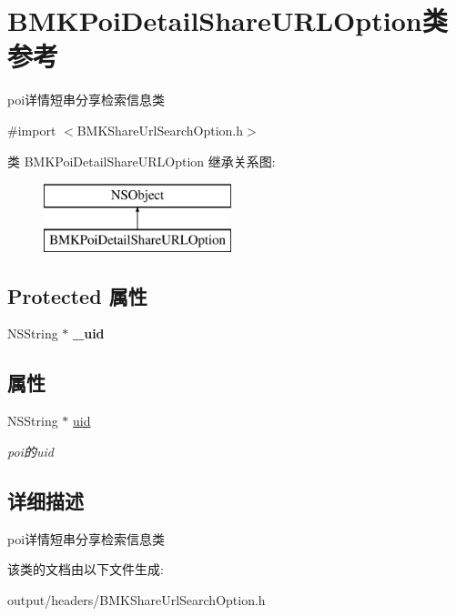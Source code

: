 \hypertarget{interface_b_m_k_poi_detail_share_u_r_l_option}{}\section{B\+M\+K\+Poi\+Detail\+Share\+U\+R\+L\+Option类 参考}
\label{interface_b_m_k_poi_detail_share_u_r_l_option}


poi详情短串分享检索信息类  




{\ttfamily \#import $<$B\+M\+K\+Share\+Url\+Search\+Option.\+h$>$}

类 B\+M\+K\+Poi\+Detail\+Share\+U\+R\+L\+Option 继承关系图\+:\begin{figure}[H]
\begin{center}
\leavevmode
\includegraphics[height=2.000000cm]{interface_b_m_k_poi_detail_share_u_r_l_option}
\end{center}
\end{figure}
\subsection*{Protected 属性}
\begin{DoxyCompactItemize}
\item 
\hypertarget{interface_b_m_k_poi_detail_share_u_r_l_option_a5c9e2a4e4a0ccda38ae749a38f74184f}{}N\+S\+String $\ast$ {\bfseries \+\_\+uid}\label{interface_b_m_k_poi_detail_share_u_r_l_option_a5c9e2a4e4a0ccda38ae749a38f74184f}

\end{DoxyCompactItemize}
\subsection*{属性}
\begin{DoxyCompactItemize}
\item 
\hypertarget{interface_b_m_k_poi_detail_share_u_r_l_option_ae0e491dbe434887138d5d6022c0ad9e2}{}N\+S\+String $\ast$ \hyperlink{interface_b_m_k_poi_detail_share_u_r_l_option_ae0e491dbe434887138d5d6022c0ad9e2}{uid}\label{interface_b_m_k_poi_detail_share_u_r_l_option_ae0e491dbe434887138d5d6022c0ad9e2}

\begin{DoxyCompactList}\small\item\em poi的uid \end{DoxyCompactList}\end{DoxyCompactItemize}


\subsection{详细描述}
poi详情短串分享检索信息类 

该类的文档由以下文件生成\+:\begin{DoxyCompactItemize}
\item 
output/headers/B\+M\+K\+Share\+Url\+Search\+Option.\+h\end{DoxyCompactItemize}
